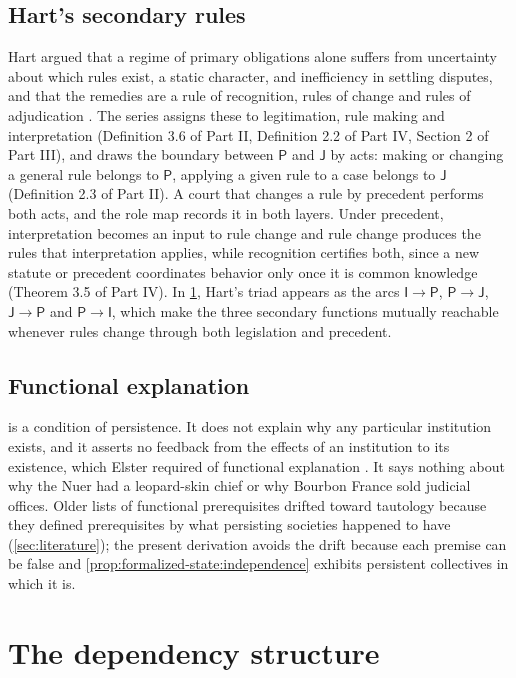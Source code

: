 \documentclass[11pt,letterpaper]{article}
\theoremstyle{definition}
\theoremstyle{remark}
\newcommand{\pP}{\mathsf{P}}
\newcommand{\pJ}{\mathsf{J}}
\newcommand{\pI}{\mathsf{I}}
\begin{document}
\subsection{Hart's secondary rules}

Hart argued that a regime of primary obligations alone suffers from uncertainty about which rules exist, a static character, and inefficiency in settling disputes, and that the remedies are a rule of recognition, rules of change and rules of adjudication \citep{hart1961}. The series assigns these to legitimation, rule making and interpretation (Definition 3.6 of Part II, Definition 2.2 of Part IV, Section 2 of Part III), and draws the boundary between $\pP$ and $\pJ$ by acts: making or changing a general rule belongs to $\pP$, applying a given rule to a case belongs to $\pJ$ (Definition 2.3 of Part II). A court that changes a rule by precedent performs both acts, and the role map records it in both layers. Under precedent, interpretation becomes an input to rule change and rule change produces the rules that interpretation applies, while recognition certifies both, since a new statute or precedent coordinates behavior only once it is common knowledge (Theorem 3.5 of Part IV). In \cref{sec:dependency}, Hart's triad appears as the arcs $\pI\to\pP$, $\pP\to\pJ$, $\pJ\to\pP$ and $\pP\to\pI$, which make the three secondary functions mutually reachable whenever rules change through both legislation and precedent.

\subsection{Functional explanation}

 is a condition of persistence. It does not explain why any particular institution exists, and it asserts no feedback from the effects of an institution to its existence, which Elster required of functional explanation \citep{elster1979,elster1983}. It says nothing about why the Nuer had a leopard-skin chief or why Bourbon France sold judicial offices. Older lists of functional prerequisites drifted toward tautology because they defined prerequisites by what persisting societies happened to have (\cref{sec:literature}); the present derivation avoids the drift because each premise can be false and \cref{prop:formalized-state:independence} exhibits persistent collectives in which it is.

\section{The dependency structure}
\label{sec:dependency}
\end{document}
